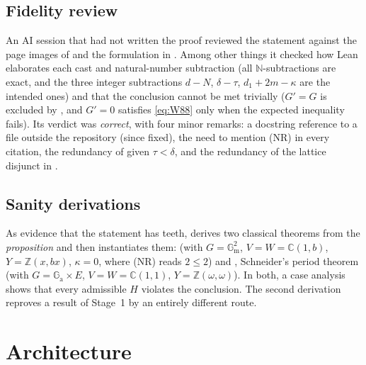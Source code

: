 \documentclass[11pt]{amsart}
\theoremstyle{definition}
\theoremstyle{remark}
\numberwithin{equation}{section}
\newcommand{\NN}{\mathbb{N}}
\newcommand{\ZZ}{\mathbb{Z}}
\newcommand{\CC}{\mathbb{C}}
\newcommand{\Ga}{\mathbb{G}_{\mathrm{a}}}
\newcommand{\Gm}{\mathbb{G}_{\mathrm{m}}}
\newcommand{\NR}{\textup{(NR)}}
\begin{document}
\subsection{Fidelity review}
An AI session that had not written the proof reviewed the statement against the page images of
\cite[pp.~385--386]{W88} and the formulation in \cite{MstarPaper}. Among other things it checked how
Lean elaborates each cast and natural-number subtraction (all $\NN$-subtractions are exact, and the
three integer subtractions $d-N$, $\delta-\tau$, $d_1+2m-\kappa$ are the intended ones) and that the
conclusion cannot be met trivially ($G'=G$ is excluded by , and $G'=0$ satisfies
\eqref{eq:W88} only when the expected inequality fails). Its verdict was \emph{correct}, with four
minor remarks: a docstring reference to a file outside the repository (since fixed), the need to
mention \NR{} in every citation, the redundancy of  given $\tau<\delta$, and the
redundancy of the lattice disjunct in .

\subsection{Sanity derivations}
As evidence that the statement has teeth,  derives two classical theorems
from the \emph{proposition}  and then instantiates them:
 (with $G=\Gm^2$, $V=W=\CC(1,b)$, $Y=\ZZ(x,bx)$, $\kappa=0$, where \NR{}
reads $2\le2$) and , Schneider's period theorem (with
$G=\Ga\times E$, $V=W=\CC(1,1)$, $Y=\ZZ(\omega,\omega)$). In both, a case analysis shows that every
admissible $H$ violates the conclusion. The second derivation reproves a result of Stage~1 by an
entirely different route.

\section{Architecture}\label{sec:arch}
\end{document}
